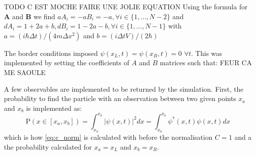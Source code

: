 TODO C EST MOCHE FAIRE UNE JOLIE EQUATION
Using the formula for $\mathbf{A}$ and $\mathbf{B}$ we find $aA_i = -aB_i = -a , \forall i \in\{1, \dots, N-2\}$ and $dA_i = 1 + 2a + b, dB_i = 1 - 2a - b , \forall i \in\{1, \dots, N-1\}$ with $a = (i\hbar \Delta t)/(4m \Delta x^2)$ and $b = (i\Delta t V)/(2\hbar)$

The border conditions imposed \(\psi(x_L, t) = \psi(x_R, t) = 0\,\, \forall t\). This was implemented by setting the coefficients of \(A\) and \(B\) matrices such that: FEUR CA ME SAOULE


A few observables are implemented to be returned by the simulation. First, the probability to find the particle with an observation between two given points $x_a$ and $x_b$ is implemented as:
\begin{equation}
    \mathrm{P}(x\in[x_a,x_b]) = \int_{x_a}^{x_b}|\psi(x,t)|^2 dx = \int_{x_a}^{x_b}\psi^*(x,t)\psi(x,t) dx
\end{equation}
which is how \autoref{eq:c_norm} is calculated with before the normalisation $C=1$ and a the probability calculated for $x_a = x_L$ and $x_b = x_R$.


